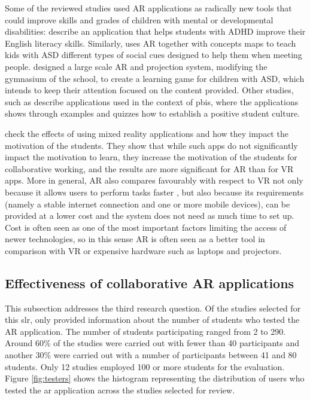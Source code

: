 Some of the reviewed studies used AR applications as radically new tools that could improve skills and grades of children with mental or developmental disabilities: \cite{luna2018words} describe an application that helps students with \gls{ADHD} improve their English literacy skills. Similarly, \cite{chen2019effects} uses AR together with concepts maps to teach kids with \gls{ASD} different types of social cues designed to help them when meeting people. \cite{takahashi2018empathic} designed a large scale AR and projection system, modifying the gymnasium of the school, to create a learning game for children with \gls{ASD}, which intends to keep their attention focused on the content provided. Other studies, such as \cite{dominguez2022collaborative, farella2021augmented, farella2022arete} describe applications used in the context of \gls{pbis}, where the applications shows through examples and quizzes how to establish a positive student culture.

\cite{258-beyoglu2020use} check the effects of using mixed reality applications and how they impact the motivation of the students. They show that while such apps do not significantly impact the motivation to learn, they increase the motivation of the students for collaborative working, and the results are more significant for AR than for \gls{VR} apps. More in general, AR also compares favourably with respect to \gls{VR} not only because it allows users to perform tasks faster \citep{7833028}, but also because its requirements (namely a stable internet connection and one or more mobile devices), can be provided at a lower cost and the system does not need as much time to set up. Cost is often seen as one of the most important factors limiting the access of newer technologies, so in this sense AR is often seen as a better tool in comparison with VR or expensive hardware such as laptops and projectors.

\subsection{Effectiveness of collaborative AR applications}

This subsection addresses the third research question. Of the \papersSelected studies selected for this \gls{slr}, only \papersWithNumStudentInfo provided information about the number of students who tested the AR application. The number of students participating ranged from 2 to 290. Around 60\% of the studies were carried out with fewer than 40 participants and another 30\% were carried out with a number of participants between 41 and 80 students. Only 12 studies employed 100 or more students for the evaluation. Figure \ref{fig:testers} shows the histogram representing the distribution of users who tested the \gls{ar} application across the studies selected for review.

